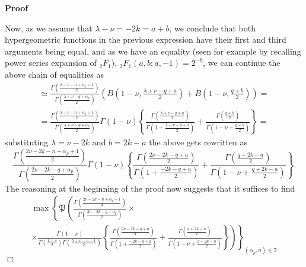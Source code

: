 \documentclass{article}
\newcommand{\um}{-}
\newenvironment{proof}{\noindent\textbf{Proof\ }}{\hspace*{\fill}$\Box$\medskip}
\numberwithin{definition}{section}
\numberwithin{lemma}{section}
\numberwithin{proposition}{section}
{\theorembodyfont{\rmfamily}\newtheorem{remark}{Remark}
\numberwithin{remark}{section}
}
\begin{document}
\begin{proof}
  
  Now, as we assume that $\lambda - \nu = - 2 k = a + b$, we conclude that
  both hypergeometric functions in the previous expression have their first
  and third arguments being equal, and as we have an equality (seen for
  example by recalling power series expansion of $_2 F_1$), $_2 F_1 ( a, b ;
  a, - 1) = 2^{- b}$, we can continue the above chain of equalities as
  \begin{eqnarray}
    & \simeq \frac{\Gamma \left( \frac{\lambda + \nu - n + \alpha_p + 1}{2}
    \right)}{\Gamma \left( \frac{\lambda + \nu - q + \alpha_p}{2} \right)}
    \left( B \left( 1 \um \nu, \frac{\lambda + \nu - q + a}{2} \right) + B
    \left( 1 - \nu, \frac{q + b}{2} \right) \right) = &  \nonumber\\
    & = \frac{\Gamma \left( \frac{\lambda + \nu - n + \alpha_p + 1}{2}
    \right)}{\Gamma \left( \frac{\lambda + \nu - q + \alpha_p}{2} \right)}
    \Gamma ( 1 - \nu) \left\{ \frac{\Gamma \left( \frac{\lambda + \nu - q +
    a}{2} \right)}{\Gamma \left( 1 + \frac{\lambda - \nu - q + a}{2} \right)}
    + \frac{\Gamma \left( \frac{q + b}{2} \right)}{\Gamma \left( 1 - \nu +
    \frac{q + b}{2} \right)} \right\} = &  \nonumber
  \end{eqnarray}
  substituting $\lambda = \nu - 2 k$ and $b = 2 k - a$ the above gets
  rewritten as
  \[ \frac{\Gamma \left( \frac{2 \nu - 2 k - n + \alpha_p + 1}{2}
     \right)}{\Gamma \left( \frac{2 \nu - 2 k - q + \alpha_p}{2} \right)}
     \Gamma ( 1 - \nu) \left\{ \frac{\Gamma \left( \frac{2 \nu - 2 k - q +
     a}{2} \right)}{\Gamma \left( 1 + \frac{- 2 k - q + a}{2} \right)} +
     \frac{\Gamma \left( \frac{q + 2 k - a}{2} \right)}{\Gamma \left( 1 - \nu
     + \frac{q + 2 k - a}{2} \right)} \right\} . \]
  The reasoning at the beginning of the proof now suggests that it suffices to
  find
  \begin{eqnarray}
    & \max \left\{ \mathfrak{P}_{} \left( \frac{\Gamma \left( \frac{2 \nu - 2
    k - n + \alpha_p + 1}{2} \right)}{\Gamma \left( \frac{2 \nu - 2 k - q +
    \alpha_p}{2} \right)} \times \right. \right. &  \nonumber\\
    & \times \left. \left. \frac{\Gamma ( 1 - \nu)}{\Gamma \left( \frac{1 -
    \nu}{2} \right) \Gamma \left( \frac{\lambda + \nu - n + 1}{2} \right)}
    \left\{ \frac{\Gamma \left( \frac{2 \nu - 2 k - q + a}{2} \right)}{\Gamma
    \left( 1 + \frac{- 2 k - q + a}{2} \right)} + \frac{\Gamma \left( \frac{q
    + 2 k - a}{2} \right)}{\Gamma \left( 1 - \nu + \frac{q + 2 k - a}{2}
    \right)} \right\} \right) \right\}_{( \alpha_p, a) \in \mathfrak{I}} & 

\end{eqnarray}
\end{proof}
\end{document}
